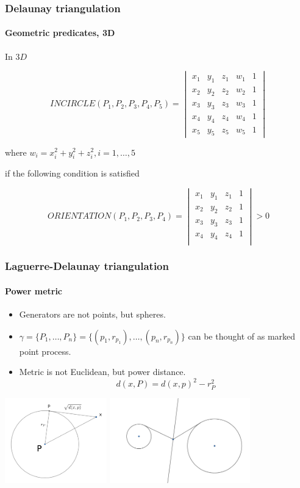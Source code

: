 \documentclass[c, 10pt]{beamer}
\begin{document}
\begin{frame}\frametitle{Delaunay triangulation}\framesubtitle{Geometric predicates, 3D}

In $3D$

$$INCIRCLE(P_1,P_2,P_3,P_4, P_5) = \begin{vmatrix} x_1 & y_1 & z_1 & w_1 & 1 \\
x_2 & y_2 & z_2 & w_2 & 1 \\
x_3 & y_3 & z_3 & w_3 & 1 \\
x_4 & y_4 & z_4 & w_4 & 1 \\
x_5 & y_5 & z_5 & w_5 & 1\end{vmatrix}$$

where $w_i = x_i^2  + y_i^2 + z_i^2, i = 1,\dots, 5$

if the following condition is satisfied

$$ORIENTATION(P_1,P_2,P_3,P_4) = 
\begin{vmatrix} 
x_1 & y_1 & z_1 & 1 \\
x_2 & y_2 & z_2 & 1 \\
x_3 & y_3 & z_3 & 1 \\
x_4 & y_4 & z_4 & 1 \\
\end{vmatrix} > 0$$

\end{frame}
\begin{frame}\frametitle{Laguerre-Delaunay triangulation}\framesubtitle{Power metric}
\begin{itemize}
\item Generators are not points, but \alert{spheres}. 
\item $\gamma = \{P_1,\dots, P_n\} = \{(p_1, r_{p_1}), \dots , (p_n, r_{p_n})\}$ can be thought of as \alert{marked point process}.
\item Metric is not Euclidean, but \alert{power distance}.
$$ d(x,P) = d(x,p)^2 - r_P^2$$
\end{itemize}

\begin{center}
\includegraphics[height = 3.7cm]{./FigureLayout/powerdistance.png}
\includegraphics[height = 3.7cm]{./FigureLayout/perpendicularbisector.png}
\end{center}

\end{frame}
\end{document}
